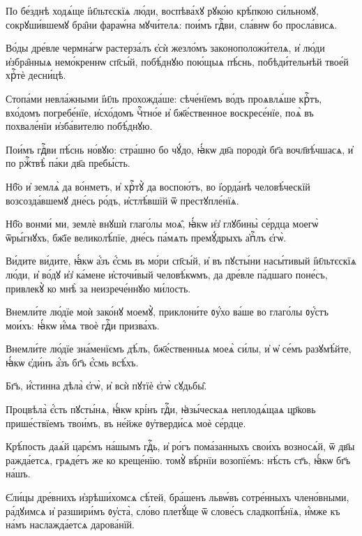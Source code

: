 \hKv По бе́зднѣ ходѧ́ще і҆и҃льтєскїѧ лю́ди, воспѣва́хꙋ рꙋко́ю  крѣ́пкою си́льномꙋ, сокрꙋши́вшемꙋ бра̑ни фараѡ́на  мꙋчи́телѧ: пои́мъ гдⷭ҇ви, сла́внѡ бо просла́висѧ.  

\hKv Во́ды дре́вле чермна́гѡ растерза́лъ є҆сѝ жезло́мъ  законоположи́телѧ, и҆ лю́ди и҆збра̑нныѧ немо́креннѡ сп҃сы́й,  побѣ́днꙋю пою́щыѧ пѣ́снь, побѣди́тельнѣй твое́й хрⷭ҇тѐ  десни́цѣ. 

\hKv Стопа́ми невла́жными і҆и҃ль прохожда́ше: сѣче́нїемъ во́дъ  проѧвлѧ́ше крⷭ҇тъ, вхо́домъ погребе́нїе, и҆схо́домъ чⷭ҇тно́е  и҆ бж҃е́ственное воскресе́нїе, поѧ̀ въ похвале́нїи  и҆зба́вителю побѣ́днꙋю. 

\hKv Пои́мъ гдⷭ҇ви пѣ́снь но́вꙋю: стра́шно бо чꙋ́до, ꙗ҆́кѡ дв҃а  породѝ бг҃а вочл҃вѣ́чшасѧ, и҆ по ржⷭ҇твѣ̀ па́ки дв҃а  пребы́сть. 
%

\hKv Нб҃о и҆ землѧ̀ да во́нметъ, и҆ хрⷭ҇тꙋ̀ да воспою́тъ, во  і҆ѻрда́нѣ человѣ́ческїй возсозда́вшемꙋ дне́сь ро́дъ,  и҆стлѣ́вшїй ѿ престꙋпле́нїѧ.  

\hKv Нб҃о вонми́ ми, землѐ внꙋшѝ глаго́лы моѧ̑, ꙗ҆́кѡ и҆з̾  глꙋбины̀ се́рдца моегѡ̀ ѿры́гнꙋхъ,  бж҃їе великолѣ́пїе, дне́сь па́мѧть премꙋ́дрыхъ  а҆пⷭ҇лъ є҆гѡ̀. 

\hKv Ви́дите ви́дите, ꙗ҆́кѡ а҆́зъ є҆́смь въ мо́ри сп҃сы́й, и҆  въ пꙋсты́ни насы́тивый і҆и҃льтєскїѧ лю́ди, и҆ во́дꙋ и҆з̾  ка́мене и҆сточи́вый человѣ́кѡмъ, да дре́вле па́дшаго  поне́съ, привлекꙋ̀ ко мнѣ̀ за неизрече́ннꙋю ми́лость. 

\hKv Внемли́те лю́дїе моѝ зако́нꙋ моемꙋ̀, приклони́те ᲂу҆́хо  ва́ше во глаго́лы ᲂу҆́стъ мои́хъ: ꙗ҆́кѡ и҆́мѧ твоѐ гдⷭ҇и  призва́хъ. 

\hKv Внемли́те лю́дїе зна́менїємъ дѣ́лъ, бж҃е́ственныѧ моеѧ̀  си́лы, и҆ ѡ҆ се́мъ разꙋмѣ́йте, ꙗ҆́кѡ є҆ди́нъ а҆́зъ бг҃ъ  є҆́смь всѣ́хъ. 

\hKv Бг҃ъ, и҆́стинна дѣла̀ є҆гѡ̀, и҆ всѝ пꙋтїѐ є҆гѡ̀  сꙋдьбы̑. 
%

\hKv Процвѣла̀ є҆́сть пꙋсты́нѧ, ꙗ҆́кѡ крі́нъ гдⷭ҇и,  ꙗ҆зы́ческаѧ неплодѧ́щаѧ цр҃ковь прише́ствїемъ твои́мъ, въ  не́йже ᲂу҆тверди́сѧ моѐ се́рдце.  
%

\hKv Крѣ́пость даѧ́й царє́мъ на́шымъ гдⷭ҇ь, и҆  ро́гъ пома́занныхъ свои́хъ возносѧ́й, ѿ дв҃ы ражда́етсѧ,  грѧде́тъ же ко креще́нїю. томꙋ̀ вѣ́рнїи возопїе́мъ: нѣ́сть  ст҃ъ, ꙗ҆́кѡ бг҃ъ на́шъ. 

\hKv Є҆ли́цы дре́внихъ и҆зрѣши́хомсѧ сѣ́тей, бра́шенъ львѡ́въ  сотре́нныхъ члено́вными, ра́дꙋимсѧ и҆ разшири́мъ ᲂу҆ста̀,  сло́во плетꙋ́ще ѿ слове́съ сладкопѣ́нїѧ, и҆́мже къ на́мъ  наслажда́етсѧ дарова́нїй. 
%

